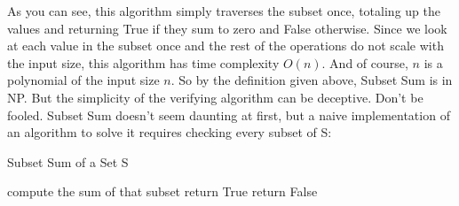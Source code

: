 \documentclass[12pt,twoside]{reedthesis}
\begin{document}
As you can see, this algorithm simply traverses the subset once, totaling up the values and returning True if they sum to zero and False otherwise. Since we look at each value in the subset once and the rest of the operations do not scale with the input size, this algorithm has time complexity $O(n)$. And of course, $n$ is a polynomial of the input size $n$. So by the definition given above, Subset Sum is in NP. But the simplicity of the verifying algorithm can be deceptive. Don't be fooled. Subset Sum doesn't seem daunting at first, but a naive implementation of an algorithm to solve it requires checking every subset of S:  
\begin{algorithm}
\caption{Subset Sum of a Set S}
\begin{algorithmic}
\State compute the sum of that subset
\State return True
\EndIf
\EndFor
\State return False
\end{algorithmic}
\end{algorithm}
\end{document}
